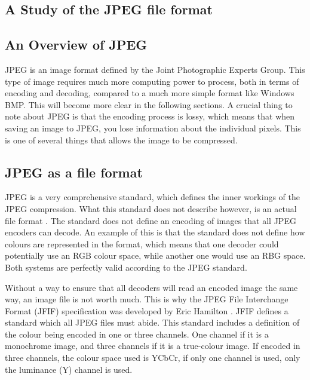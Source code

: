 \begin{infobox}{\section[A Study of the JPEG File Format]{A Study of the JPEG file format}\label{sec:jpegStudy}}

\subsection{An Overview of JPEG}
\vspace{-2.5mm}
JPEG is an image format defined by the Joint Photographic Experts Group. 
This type of image requires much more computing power to process, both in terms of encoding and decoding, compared to a much more simple format like Windows BMP. This will become more clear in the following sections. 
A crucial thing to note about JPEG is that the encoding process is lossy, which means that when saving an image to JPEG, you lose information about the individual pixels. This is one of several things that allows the image to be compressed.

\vspace{4mm}
\subsection{JPEG as a file format}
\vspace{-2.5mm}
JPEG is a very comprehensive standard, which defines the inner workings of the JPEG compression. 
What this standard does not describe however, is an actual file format \citep{Miano1999}. 
The standard does not define an encoding of images that all JPEG encoders can decode.
An example of this is that the standard does not define how colours are represented in the format, which means that one decoder could potentially use an RGB colour space, while another one would use an RBG space.
Both systems are perfectly valid according to the JPEG standard.

Without a way to ensure that all decoders will read an encoded image the same way, an image file is not worth much. This is why the JPEG File Interchange Format (JFIF) specification was developed by Eric Hamilton \citep{JFIFSpecs}. JFIF defines a standard which all JPEG files must abide. This standard includes a definition of the colour being encoded in one or three channels. One channel if it is a monochrome image, and three channels if it is a true-colour image. If encoded in three channels, the colour space used is YCbCr, if only one channel is used, only the luminance (Y) channel is used.


\end{infobox}
